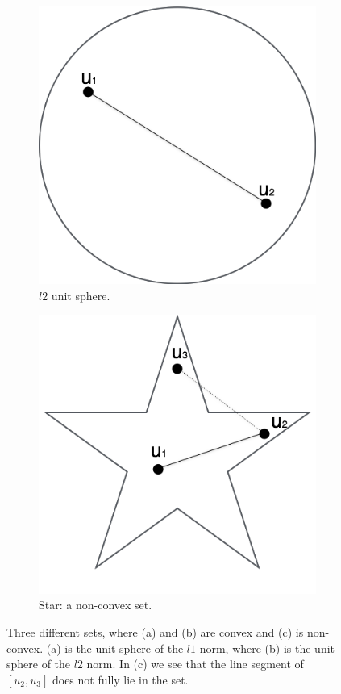 \documentclass[abstracton]{scrreprt}
\begin{document}
\begin{figure}[!ht]
\begin{subfigure}[b]{0.3\textwidth}
                \includegraphics[width=\textwidth]{img/unit_l2_norm.png}
                \caption{$l2$ unit sphere.}
            \end{subfigure}
            \begin{subfigure}[b]{0.3\textwidth}
                \includegraphics[width=\textwidth]{img/non_convex_set.png}
                \caption{Star: a non-convex set.}
            \end{subfigure}
            \caption[Examples of convex sets.]{Three different sets, where (a) and (b) are convex and (c) is non-convex. (a) is the unit sphere of the $l1$ norm, where (b) is the unit sphere of the $l2$ norm. In (c) we see that the line segment of $[u_{2}, u_{3}]$ does not fully lie in the set.}
            \label{fig:convex_and_non_convex_sets}
        \end{figure}
\end{document}
